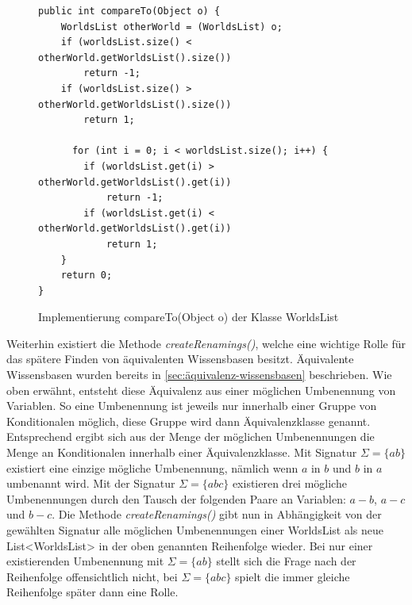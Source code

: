\documentclass[12pt,a4paper]{article}
\begin{document}
\begin{figure}
\begin{lstlisting}
public int compareTo(Object o) {
    WorldsList otherWorld = (WorldsList) o;
    if (worldsList.size() < otherWorld.getWorldsList().size())
        return -1;
    if (worldsList.size() > otherWorld.getWorldsList().size())
        return 1;
          
      for (int i = 0; i < worldsList.size(); i++) {
        if (worldsList.get(i) > otherWorld.getWorldsList().get(i))
            return -1;
        if (worldsList.get(i) < otherWorld.getWorldsList().get(i))
            return 1;
    }
    return 0;
}
\end{lstlisting}
\caption{Implementierung compareTo(Object o) der Klasse WorldsList}
\label{code:compare-worldslist}
\end{figure}


Weiterhin existiert die Methode \textit{createRenamings()}, welche eine wichtige Rolle für das spätere Finden von äquivalenten Wissensbasen besitzt. Äquivalente Wissensbasen wurden bereits in  \autoref{sec:äquivalenz-wissensbasen} beschrieben. Wie oben erwähnt, entsteht diese Äquivalenz aus einer möglichen Umbenennung von Variablen. So eine Umbenennung ist jeweils nur innerhalb einer Gruppe von Konditionalen möglich, diese Gruppe wird dann Äquivalenzklasse genannt. Entsprechend ergibt sich aus der Menge der möglichen Umbenennungen die Menge an Konditionalen innerhalb einer Äquivalenzklasse. Mit Signatur $\Sigma=\{ab\}$ existiert eine einzige mögliche Umbenennung, nämlich wenn $a$ in $b$ und $b$ in $a$ umbenannt wird. Mit der Signatur $\Sigma=\{abc\}$ existieren drei mögliche Umbenennungen durch den Tausch der folgenden Paare an Variablen: $a-b$, $a-c$ und $b-c$. Die Methode \textit{createRenamings()} gibt nun in Abhängigkeit von der gewählten Signatur alle möglichen Umbenennungen einer WorldsList als neue List<WorldsList> in der oben genannten Reihenfolge wieder. Bei nur einer existierenden Umbenennung mit $\Sigma=\{ab\}$ stellt sich die Frage nach der Reihenfolge offensichtlich nicht, bei $\Sigma=\{abc\}$ spielt die immer gleiche Reihenfolge später dann eine Rolle.
\end{document}
